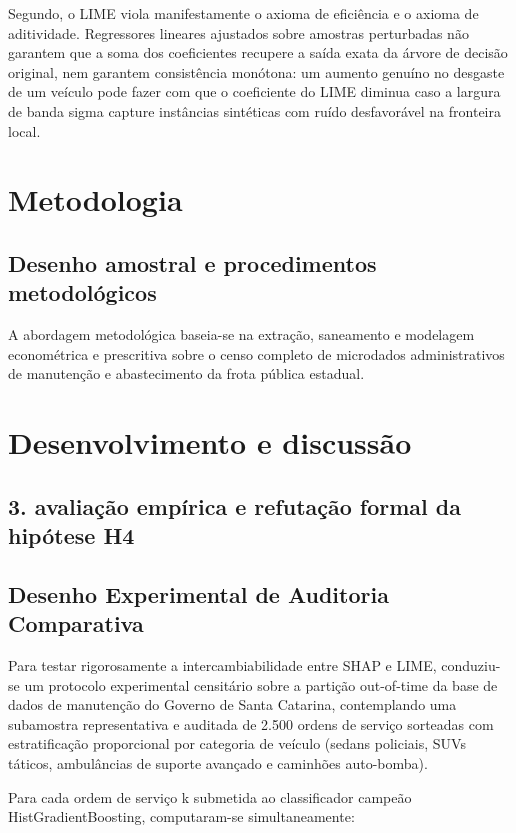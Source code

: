 \documentclass[12pt,a4paper]{article}
\begin{document}
Segundo, o LIME viola manifestamente o axioma de eficiência e o axioma de aditividade. Regressores lineares ajustados sobre amostras perturbadas não garantem que a soma dos coeficientes recupere a saída exata da árvore de decisão original, nem garantem consistência monótona: um aumento genuíno no desgaste de um veículo pode fazer com que o coeficiente do LIME diminua caso a largura de banda sigma capture instâncias sintéticas com ruído desfavorável na fronteira local.


\section{Metodologia}


\subsection{Desenho amostral e procedimentos metodológicos}

A abordagem metodológica baseia-se na extração, saneamento e modelagem econométrica e prescritiva sobre o censo completo de microdados administrativos de manutenção e abastecimento da frota pública estadual.


\section{Desenvolvimento e discussão}


\subsection{3. avaliação empírica e refutação formal da hipótese H4}


\subsection{Desenho Experimental de Auditoria Comparativa}

Para testar rigorosamente a intercambiabilidade entre SHAP e LIME, conduziu-se um protocolo experimental censitário sobre a partição out-of-time da base de dados de manutenção do Governo de Santa Catarina, contemplando uma subamostra representativa e auditada de 2.500 ordens de serviço sorteadas com estratificação proporcional por categoria de veículo (sedans policiais, SUVs táticos, ambulâncias de suporte avançado e caminhões auto-bomba).

Para cada ordem de serviço k submetida ao classificador campeão HistGradientBoosting, computaram-se simultaneamente:
\end{document}
